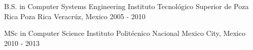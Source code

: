 

\begin{cventries}

  \cventry
    {B.S. in Computer Systems Engineering} %
    {Instituto Tecnológico Superior de Poza Rica} %
    {Poza Rica Veracrúz, Mexico} %
    {2005 - 2010} %
    {
    }
    
    
  \cventry
    {MSc in Computer Science} %
    {Instituto Politécnico Nacional} %
    {Mexico City, Mexico} %
    {2010 - 2013} %
    {
    }
    

\end{cventries}
